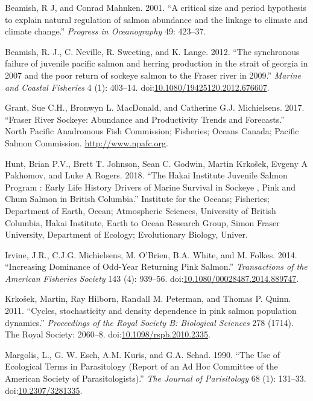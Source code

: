 \documentclass[fleqn,10pt]{wlpeerj} %
\begin{document}
\hypertarget{ref-Beamish2001}{}
Beamish, R J, and Conrad Mahnken. 2001. ``A critical size and period
hypothesis to explain natural regulation of salmon abundance and the
linkage to climate and climate change.'' \emph{Progress in Oceanography}
49: 423--37.

\hypertarget{ref-Beamish2012}{}
Beamish, R. J., C. Neville, R. Sweeting, and K. Lange. 2012. ``The
synchronous failure of juvenile pacific salmon and herring production in
the strait of georgia in 2007 and the poor return of sockeye salmon to
the Fraser river in 2009.'' \emph{Marine and Coastal Fisheries} 4 (1):
403--14.
doi:\href{https://doi.org/10.1080/19425120.2012.676607}{10.1080/19425120.2012.676607}.

\hypertarget{ref-Grant2017}{}
Grant, Sue C.H., Bronwyn L. MacDonald, and Catherine G.J. Michielsens.
2017. ``Fraser River Sockeye: Abundance and Productivity Trends and
Forecasts.'' North Pacific Anadromous Fish Commission; Fisheries; Oceans
Canada; Pacific Salmon Commission. \url{http://www.npafc.org}.

\hypertarget{ref-Hunt2018}{}
Hunt, Brian P.V., Brett T. Johnson, Sean C. Godwin, Martin Krkošek,
Evgeny A Pakhomov, and Luke A Rogers. 2018. ``The Hakai Institute
Juvenile Salmon Program : Early Life History Drivers of Marine Survival
in Sockeye , Pink and Chum Salmon in British Columbia.'' Institute for
the Oceans; Fisheries; Department of Earth, Ocean; Atmospheric Sciences,
University of British Columbia, Hakai Institute, Earth to Ocean Research
Group, Simon Fraser University, Department of Ecology; Evolutionary
Biology, Univer.

\hypertarget{ref-Irvine2014}{}
Irvine, J.R., C.J.G. Michielsens, M. O'Brien, B.A. White, and M. Folkes.
2014. ``Increasing Dominance of Odd-Year Returning Pink Salmon.''
\emph{Transactions of the American Fisheries Society} 143 (4): 939--56.
doi:\href{https://doi.org/10.1080/00028487.2014.889747}{10.1080/00028487.2014.889747}.

\hypertarget{ref-Krkosek2011}{}
Krkošek, Martin, Ray Hilborn, Randall M. Peterman, and Thomas P. Quinn.
2011. ``Cycles, stochasticity and density dependence in pink salmon
population dynamics.'' \emph{Proceedings of the Royal Society B:
Biological Sciences} 278 (1714). The Royal Society: 2060--8.
doi:\href{https://doi.org/10.1098/rspb.2010.2335}{10.1098/rspb.2010.2335}.

\hypertarget{ref-Margolis1990}{}
Margolis, L., G. W. Esch, A.M. Kuris, and G.A. Schad. 1990. ``The Use of
Ecological Terms in Parasitology (Report of an Ad Hoc Committee of the
American Society of Parasitologists).'' \emph{The Journal of
Parisitology} 68 (1): 131--33.
doi:\href{https://doi.org/10.2307/3281335}{10.2307/3281335}.
\end{document}
